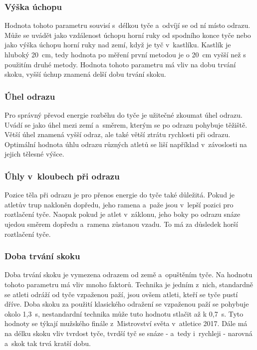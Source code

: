 \subsubsection{Výška úchopu}

Hodnota tohoto parametru souvisí s~délkou tyče a~odvíjí se od ní místo odrazu. Může se uvádět jako vzdálenost úchopu horní ruky od spodního konce tyče nebo jako výška úchopu horní ruky nad zemí, když je tyč v~kastlíku. Kastlík je hluboký 20~cm, tedy hodnota po měření první metodou je o 20~cm vyšší než s použitím druhé metody. Hodnota tohoto parametru má vliv na dobu trvání skoku, vyšší úchup znamená delší dobu trvání skoku.

\subsubsection{Úhel odrazu}

Pro správný převod energie rozběhu do tyče je užitečné zkoumat úhel odrazu. Uvádí se jako úhel mezi zemí a~směrem, kterým se po odrazu pohybuje těžiště. Větší úhel znamená vyšší odraz, ale také větší ztrátu rychlosti při odrazu. Optimální hodnota úhlu odrazu různých atletů se liší například v~závoslosti na jejich tělesné výšce.

\subsubsection{Úhly v~kloubech při odrazu}

Pozice těla při odrazu je pro přenos energie do tyče také důležitá. Pokud je atletův trup nakloněn dopředu, jeho ramena a~paže jsou v~lepší pozici pro roztlačení tyče. Naopak pokud je atlet v~záklonu, jeho boky po odrazu snáze ujedou směrem dopředu a~ramena zůstanou vzadu. To má za důsledek horší roztlačení tyče.

\subsubsection{Doba trvání skoku}

Doba trvání skoku je vymezena odrazem od země a~opuštěním tyče. Na hodnotu tohoto parametru má vliv mnoho faktorů. Technika je jedním z~nich, standardně se atleti odráží od tyče vzpaženou paží, jsou ovšem atleti, kteří se tyče pustí dříve. Doba skoku za použití klasického odražení se vzpaženou paží se pohybuje okolo 1,3~s, nestandardní technika může tuto hodnotu stlačit až k 0,7~s. Tyto hodnoty se týkají mužského finále z~Mistrovství světa v~atletice 2017. Dále má na délku skoku vliv tvrdost tyče, tvrdší tyč se snáze - a~tedy i~rychleji - narovná a~skok tak trvá kratší dobu.

